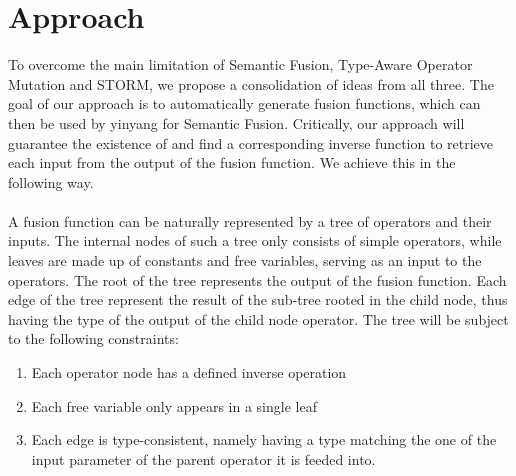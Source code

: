 \section*{Approach}
To overcome the main limitation of Semantic Fusion, Type-Aware Operator Mutation and STORM, we propose a consolidation of ideas from all three. The goal of our approach is to automatically generate fusion functions, which can then be used by yinyang for Semantic Fusion. Critically, our approach will guarantee the existence of and find a corresponding inverse function to retrieve each input from the output of the fusion function. We achieve this in the following way. 
\\ \\
A fusion function can be naturally represented by a tree of operators and their inputs. The internal nodes of such a tree only consists of simple operators, while leaves are made up of constants and free variables, serving as an input to the operators. The root of the tree represents the output of the fusion function. Each edge of the tree represent the result of the sub-tree rooted in the child node, thus having the type of the output of the child node operator. The tree will be subject to the following constraints:

\begin{enumerate}
    \item Each operator node has a defined inverse operation
    \item Each free variable only appears in a single leaf
    \item Each edge is type-consistent, namely having a type matching the one of the input parameter of the parent operator it is feeded into.
\end{enumerate}

